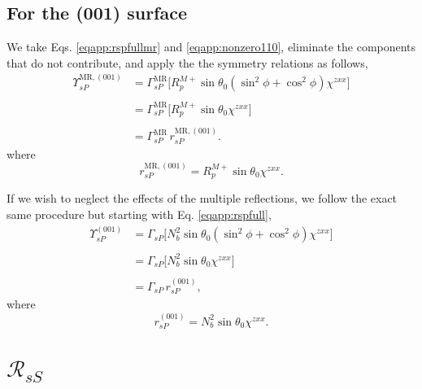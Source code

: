\subsection{For the (001) surface}

We take Eqs. \eqref{eqapp:rspfullmr} and \eqref{eqapp:nonzero110}, eliminate the
components that do not contribute, and apply the the symmetry relations as
follows,
\begin{equation*}
\begin{split}
\Upsilon^{\mathrm{MR},(001)}_{sP} &=
\Gamma^{\mathrm{MR}}_{sP}
\big[
R^{M+}_{p}\sin\theta_{0}(\sin^{2}\phi + \cos^{2}\phi)\chi^{zxx}
\big]\\\\
&=
\Gamma^{\mathrm{MR}}_{sP}
\big[
R^{M+}_{p}\sin\theta_{0}\chi^{zxx}
\big]\\\\
&= \Gamma^{\mathrm{MR}}_{sP}\,r^{\mathrm{MR},(001)}_{sP}.
\end{split}
\end{equation*}
where
\begin{equation}\label{eqapp:final-rsp.mr.001}
r^{\mathrm{MR},(001)}_{sP} = 
R^{M+}_{p}\sin\theta_{0}\chi^{zxx}.
\end{equation}

If we wish to neglect the effects of the multiple reflections, we follow the
exact same procedure but starting with Eq. \eqref{eqapp:rspfull},
\begin{equation*}
\begin{split}
\Upsilon^{(001)}_{sP} &=
\Gamma_{sP}
\big[
N^{2}_{b}\sin\theta_{0}(\sin^{2}\phi + \cos^{2}\phi)\chi^{zxx}
\big]\\\\
&=
\Gamma_{sP}
\big[
N^{2}_{b}\sin\theta_{0}\chi^{zxx}
\big]\\\\
&=
\Gamma_{sP}\,r^{(001)}_{sP},
\end{split}
\end{equation*}
where
\begin{equation}\label{eqapp:final-rsp.001}
r^{(001)}_{sP} = 
N^{2}_{b}\sin\theta_{0}\chi^{zxx}.
\end{equation}




\section{\texorpdfstring{$\mathcal{R}_{sS}$}{RsS}}


